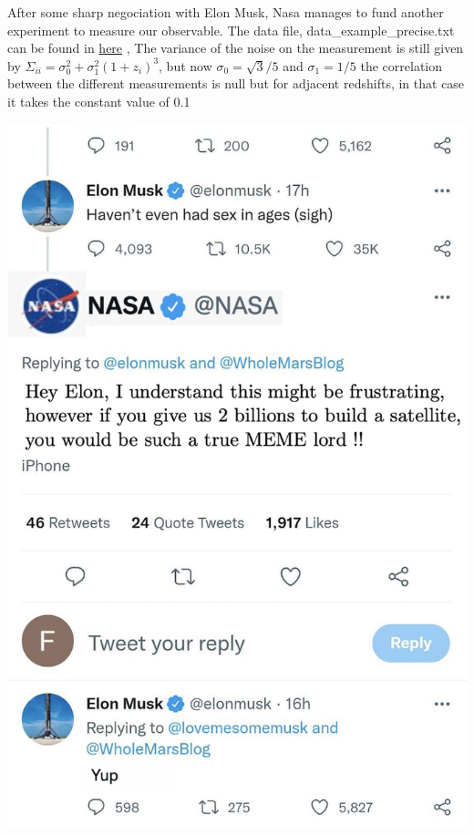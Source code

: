 \documentclass[a4paper]{article}
\begin{document}
\begin{minipage}[b]{0.5\linewidth}
After some sharp negociation with Elon Musk, Nasa manages to fund another experiment to measure our observable. The data file, data\_example\_precise.txt can be found in \href{https://github.com/thibautlouis/TD/}{here} , The variance of the noise on the measurement is still given by $ \Sigma_{ii} =  \sigma_{0}^{2} + \sigma_{1}^{2} (1+z_{i})^{3}$, but now $\sigma_{0} = \sqrt{3}/5$ and  $\sigma_{1} = 1/5$   the correlation between the different measurements is null but for adjacent redshifts, in that case it takes the constant value of 0.1
\end{minipage}
\hfill
\begin{minipage}[b]{0.5\linewidth}
\includegraphics[height=22\baselineskip]{musk}
\end{minipage} \\
\end{document}
